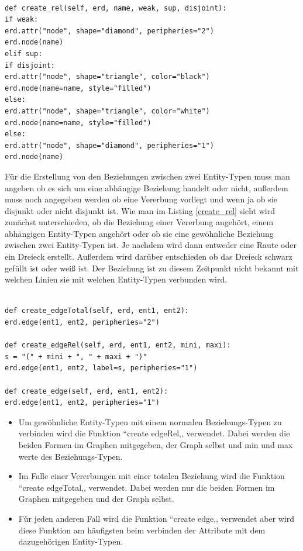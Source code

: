 \noindent
\lstset{language=Python}
\lstset{frame=lines}
\lstset{basicstyle=\footnotesize}
\begin{lstlisting}

def create_rel(self, erd, name, weak, sup, disjoint):
if weak:
erd.attr("node", shape="diamond", peripheries="2")
erd.node(name)
elif sup:
if disjoint:
erd.attr("node", shape="triangle", color="black")
erd.node(name=name, style="filled")
else:
erd.attr("node", shape="triangle", color="white")
erd.node(name=name, style="filled")
else:
erd.attr("node", shape="diamond", peripheries="1")
erd.node(name)

\end{lstlisting}
\noindent
Für die Erstellung von den Beziehungen zwischen zwei Entity-Typen muss man angeben ob es sich um eine abhängige Beziehung handelt oder nicht, außerdem muss noch angegeben werden ob eine Vererbung vorliegt und wenn ja ob sie disjunkt oder nicht disjunkt ist. Wie man im Listing \ref{create_rel} sieht wird zunächst unterschieden, ob die Beziehung einer Vererbung angehört, einem abhängigen Entity-Typen angehört oder ob sie eine gewöhnliche Beziehung zwischen zwei Entity-Typen ist. Je nachdem wird dann entweder eine Raute oder ein Dreieck erstellt. Außerdem wird darüber entschieden ob das Dreieck schwarz gefüllt ist oder weiß ist. Der Beziehung ist zu diesem Zeitpunkt nicht bekannt mit welchen Linien sie mit welchen Entity-Typen verbunden wird.
\newpage
\fib{}
\noindent
\lstset{language=Python}
\lstset{frame=lines}
\lstset{basicstyle=\footnotesize}
\begin{lstlisting}

def create_edgeTotal(self, erd, ent1, ent2):
erd.edge(ent1, ent2, peripheries="2")

def create_edgeRel(self, erd, ent1, ent2, mini, maxi):
s = "(" + mini + ", " + maxi + ")"
erd.edge(ent1, ent2, label=s, peripheries="1")

def create_edge(self, erd, ent1, ent2):
erd.edge(ent1, ent2, peripheries="1")

\end{lstlisting}
\noindent
\begin{itemize}
	\item Um gewöhnliche Entity-Typen mit einem normalen Beziehungs-Typen zu verbinden wird die Funktion ``create edgeRel,, verwendet. Dabei werden die beiden Formen im Graphen mitgegeben, der Graph selbst und min und max werte des Beziehungs-Typen.
	\item Im Falle einer Vererbungen mit einer totalen Beziehung wird die Funktion ``create edgeTotal,, verwendet.  Dabei werden nur die beiden Formen im Graphen mitgegeben und der Graph selbst.
	\item Für jeden anderen Fall wird die Funktion ``create edge,, verwendet aber wird diese Funktion am häufigsten beim verbinden der Attribute  mit dem dazugehörigen Entity-Typen.
\end{itemize}

